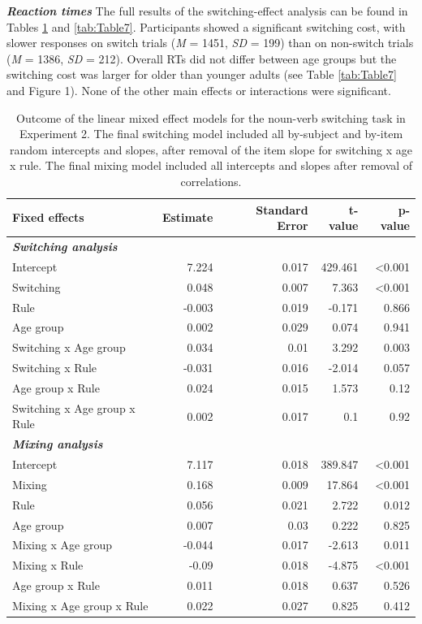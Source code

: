 \documentclass[
]{article}
\begin{document}
\textbf{\emph{Reaction times}}
The full results of the switching-effect analysis can be found in Tables \ref{tab:Table6} and \ref{tab:Table7}. Participants showed a significant switching cost, with slower responses on switch trials (\emph{M} = 1451, \emph{SD} = 199) than on non-switch trials (\emph{M} = 1386, \emph{SD} = 212). Overall RTs did not differ between age groups but the switching cost was larger for older than younger adults (see Table \ref{tab:Table7} and Figure 1). None of the other main effects or interactions were significant.

\begin{table}

\caption{\label{tab:Table6}Outcome of the linear mixed effect models for the noun-verb switching task in Experiment 2. The final switching model included all by-subject and by-item random intercepts and slopes, after removal of the item slope for switching x age x rule. The final mixing model included all intercepts and slopes after removal of correlations.}
\centering
\begin{tabular}[t]{lrrrr}
\toprule
\textbf{Fixed effects} & \textbf{Estimate} & \textbf{Standard Error} & \textbf{t-value} & \textbf{p-value}\\
\midrule
\em{\textbf{Switching analysis}} & \em{\textbf{}} & \em{\textbf{}} & \em{\textbf{}} & \em{\textbf{}}\\
Intercept & 7.224 & 0.017 & 429.461 & <0.001\\
Switching & 0.048 & 0.007 & 7.363 & <0.001\\
Rule & -0.003 & 0.019 & -0.171 & 0.866\\
Age group & 0.002 & 0.029 & 0.074 & 0.941\\
\addlinespace
Switching x Age group & 0.034 & 0.01 & 3.292 & 0.003\\
Switching x Rule & -0.031 & 0.016 & -2.014 & 0.057\\
Age group x Rule & 0.024 & 0.015 & 1.573 & 0.12\\
Switching x Age group x Rule & 0.002 & 0.017 & 0.1 & 0.92\\
\em{\textbf{Mixing analysis}} & \em{\textbf{}} & \em{\textbf{}} & \em{\textbf{}} & \em{\textbf{}}\\
\addlinespace
Intercept & 7.117 & 0.018 & 389.847 & <0.001\\
Mixing & 0.168 & 0.009 & 17.864 & <0.001\\
Rule & 0.056 & 0.021 & 2.722 & 0.012\\
Age group & 0.007 & 0.03 & 0.222 & 0.825\\
Mixing x Age group & -0.044 & 0.017 & -2.613 & 0.011\\
\addlinespace
Mixing x Rule & -0.09 & 0.018 & -4.875 & <0.001\\
Age group x Rule & 0.011 & 0.018 & 0.637 & 0.526\\
Mixing x Age group x Rule & 0.022 & 0.027 & 0.825 & 0.412\\
\bottomrule
\end{tabular}
\end{table}
\end{document}
